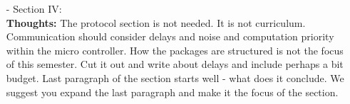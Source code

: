 \begin{itemize}
	\item[-] Section IV: \\
           \textbf{Thoughts:} The protocol section is not needed. It is not curriculum. Communication should consider delays and noise and computation priority within the micro controller. How the packages are structured is not the focus of this semester. Cut it out and write about delays and include perhaps a bit budget. Last paragraph of the section starts well - what does it conclude. We suggest you expand the last paragraph and make it the focus of the section. 
\end{itemize}
